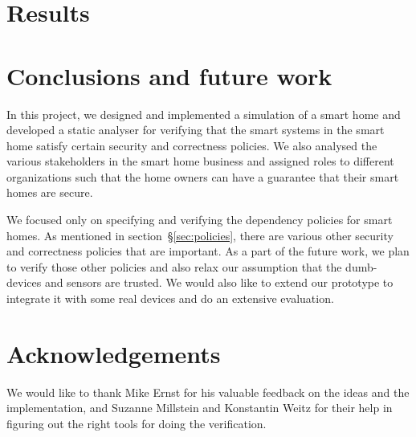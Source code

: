 \documentclass{article}
\begin{document}
\section{Results}

\section{Conclusions and future work}
In this project, we designed and implemented a simulation of a smart home and developed a static analyser for verifying that the smart systems in the smart home satisfy certain security and correctness policies. We also analysed the various stakeholders in the smart home business and assigned roles to different organizations such that the home owners can have a guarantee that their smart homes are secure. 

We focused only on specifying and verifying the dependency policies for smart homes. As mentioned in section~\S\ref{sec:policies}, there are various other security and correctness policies that are important. As a part of the future work, we plan to verify those other policies and also relax our assumption that the dumb-devices and sensors are trusted. We would also like to extend our prototype to integrate it with some real devices and do an extensive evaluation.
\section{Acknowledgements}
We would like to thank Mike Ernst for his valuable feedback on the ideas and the implementation, and Suzanne Millstein and Konstantin Weitz for their help in figuring out the right tools for doing the verification.


\end{document}
